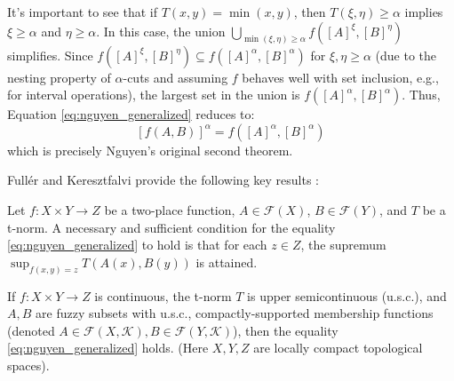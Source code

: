It's important to see that if $T(x,y) = \min(x,y)$, then $T(\xi, \eta) \ge \alpha$ implies $\xi \ge \alpha$ and $\eta \ge \alpha$. In this case, the union $\bigcup_{\min(\xi, \eta) \ge \alpha} f([A]^\xi, [B]^\eta)$ simplifies. Since $f([A]^\xi, [B]^\eta) \subseteq f([A]^\alpha, [B]^\alpha)$ for $\xi, \eta \ge \alpha$ (due to the nesting property of $\alpha$-cuts and assuming $f$ behaves well  with set inclusion, e.g., for interval operations), the largest set in the union is $f([A]^\alpha, [B]^\alpha)$. Thus, Equation \eqref{eq:nguyen_generalized} reduces to:
\[
[f(A, B)]^\alpha = f([A]^\alpha, [B]^\alpha)
\]
which is precisely Nguyen's original second theorem.

Fullér and Keresztfalvi provide the following key results \cite[Thms. 1.9.1, 1.9.2]{FULLER2}:
\begin{theorem}
    Let $f: X \times Y \to Z$ be a two-place function, $A \in \mathcal{F}(X)$, $B \in \mathcal{F}(Y)$, and $T$ be a t-norm. A necessary and sufficient condition for the equality \eqref{eq:nguyen_generalized} to hold is that for each $z \in Z$, the supremum $\sup_{f(x,y)=z} T(A(x), B(y))$ is attained.
\end{theorem}

\begin{theorem}
    If $f: X \times Y \to Z$ is continuous, the t-norm $T$ is upper semicontinuous (u.s.c.), and $A, B$ are fuzzy subsets with u.s.c., compactly-supported membership functions (denoted $A \in \mathcal{F}(X, \mathcal{K}), B \in \mathcal{F}(Y, \mathcal{K})$), then the equality \eqref{eq:nguyen_generalized} holds.
    (Here $X, Y, Z$ are locally compact topological spaces).
\end{theorem}












